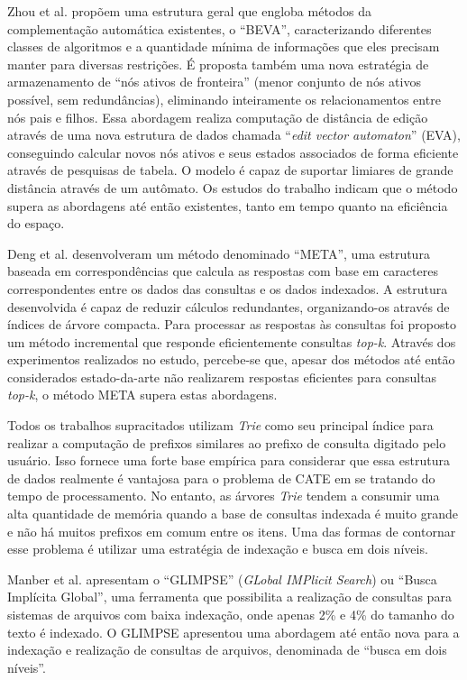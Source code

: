 Zhou et al. \citep{zhou2016beva} propõem uma estrutura geral que engloba métodos da complementação automática existentes, o ``BEVA'', caracterizando diferentes classes de algoritmos e a quantidade mínima de informações que eles precisam manter para diversas restrições. É proposta também uma nova estratégia de armazenamento de ``nós ativos de fronteira'' (menor conjunto de nós ativos possível, sem redundâncias), eliminando inteiramente os relacionamentos entre nós pais e filhos. Essa abordagem realiza computação de distância de edição através de uma nova estrutura de dados chamada ``\textit{edit vector automaton}'' (EVA), conseguindo calcular novos nós ativos e seus estados associados de forma eficiente através de pesquisas de tabela. O modelo é capaz de suportar limiares de grande distância através de um autômato. Os estudos do trabalho indicam que o método supera as abordagens até então existentes, tanto em tempo quanto na eficiência do espaço.

Deng et al. \citep{deng2016meta} desenvolveram um método denominado ``META'', uma estrutura baseada em correspondências que calcula as respostas com base em caracteres correspondentes entre os dados das consultas e os dados indexados. A estrutura desenvolvida é capaz de reduzir cálculos redundantes, organizando-os através de índices de árvore compacta. Para processar as respostas às consultas foi proposto um método incremental que responde eficientemente consultas \textit{top-k}. Através dos experimentos realizados no estudo, percebe-se que, apesar dos métodos até então considerados estado-da-arte não realizarem respostas eficientes para consultas \textit{top-k}, o método META supera estas abordagens.

Todos os trabalhos supracitados utilizam \textit{Trie} como seu principal índice para realizar a computação de prefixos similares ao prefixo de consulta digitado pelo usuário. Isso fornece uma forte base empírica para considerar que essa estrutura de dados realmente é vantajosa para o problema de CATE em se tratando do tempo de processamento. No entanto, as árvores \textit{Trie} tendem a consumir uma alta quantidade de memória quando a base de consultas indexada é muito grande e não há muitos prefixos em comum entre os itens. Uma das formas de contornar esse problema é utilizar uma estratégia de indexação e busca em dois níveis.

Manber et al. \citep{manber1994glimpse} apresentam o ``GLIMPSE'' (\textit{GLobal IMPlicit Search}) ou ``Busca Implícita Global'', uma ferramenta que possibilita a realização de consultas para sistemas de arquivos com baixa indexação, onde apenas 2\% e 4\% do tamanho do texto é indexado. O GLIMPSE apresentou uma abordagem até então nova para a indexação e realização de consultas de arquivos, denominada de ``busca em dois níveis''.

